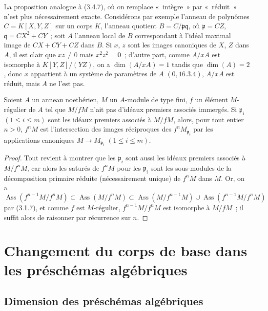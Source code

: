\begin{remark}[3.4.8]
\label{IV.2.3.4.8-fr}
La proposition analogue à (3.4.7), où on remplace «~intègre~» par
«~réduit~» n'est plus nécessairement exacte. Considérons par exemple l'anneau
de polynômes $C=K[X,Y,Z]$ sur un corps $K$, l'anneau quotient
$B=C/\mathfrak p\mathfrak q$, où $\mathfrak p=CZ$,
$\mathfrak q=CX^2+CY$~; soit $A$ l'anneau local de $B$ correspondant à l'idéal
maximal image de $CX+CY+CZ$ dans $B$. Si $x$, $z$ sont les images canoniques
de $X$, $Z$ dans $A$, il est clair que $xz\neq0$ mais $x^2z^2=0$~; d'autre
part, comme $A/xA$ est isomorphe à $K[Y,Z]/(YZ)$, on a
$\dim(A/xA)=1$ tandis que $\dim(A)=2$, donc $x$ appartient à un système de
paramètres de $A$ $(0,16.3.4)$, $A/xA$ est réduit, mais $A$ ne l'est pas.
\end{remark}

\begin{proposition}[3.4.9]
\label{IV.2.3.4.9-fr}
Soient $A$ un anneau noethérien, $M$ un $A$-module de type fini, $f$ un
élément $M$-régulier de $A$ tel que $M/fM$ n'ait pas d'idéaux premiers
associés immergés. Si $\mathfrak p_i$ $(1\leqslant i\leqslant m)$ sont les
idéaux premiers associés à $M/fM$, alors, pour tout entier $n>0$, $f^nM$ est
l'intersection des images réciproques des $f^nM_{\mathfrak p_i}$ par les
applications canoniques $M\to M_{\mathfrak p_i}$ $(1\leqslant i\leqslant m)$.
\end{proposition}

\begin{proof}
Tout revient à montrer que les $\mathfrak p_i$ sont aussi les idéaux premiers
associés à $M/f^nM$, car alors les saturés de $f^nM$ pour les
$\mathfrak p_i$ sont les sous-modules de la décomposition primaire réduite
(nécessairement unique) de $f^nM$ dans $M$. Or, on a
\[
\operatorname{Ass}(f^{n-1}M/f^nM)
\subset\operatorname{Ass}(M/f^nM)
\subset\operatorname{Ass}(M/f^{n-1}M)
\cup\operatorname{Ass}(f^{n-1}M/f^nM)
\]
par (3.1.7), et comme $f$ est $M$-régulier,
$f^{n-1}M/f^nM$ est isomorphe à $M/fM$~; il suffit alors de raisonner par
récurrence sur $n$.
\end{proof}

\section{Changement du corps de base dans les préschémas algébriques}
\label{IV.2.4-fr}

\subsection{Dimension des préschémas algébriques}
\label{subsection:IV.2.4.1-fr}

